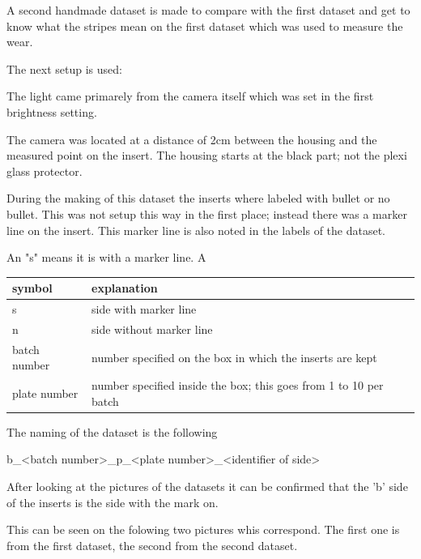 \documentclass{article}
\begin{document}
A second handmade dataset is made to compare with the first dataset and get to know what the stripes mean on the first dataset which was used to measure the wear.



The next setup is used:

The light came primarely from the camera itself which was set in the first brightness setting. 

The camera was located at a distance of 2cm between the housing and the measured point on the insert. The housing starts at the black part; not the plexi glass protector. 

During the making of this dataset the inserts where labeled with bullet or no bullet. This was not setup this way in the first place; instead there was a marker line on the insert. This marker line is also noted in the labels of the dataset.

An "s" means it is with a marker line. A

\begin{tabular}{ |l|l| }
\hline
 symbol & explanation \tabularnewline
\hline
\hline
 s & side with marker line \tabularnewline
\hline
 n & side without marker line \tabularnewline
\hline
 batch number & number specified on the box in which the inserts are kept \tabularnewline
\hline
 plate number & number specified inside the box; this goes from 1 to 10 per batch \tabularnewline
\hline
\end{tabular}


The naming of the dataset is the following

b\_\textless{}batch number\textgreater{}\_p\_\textless{}plate number\textgreater{}\_\textless{}identifier of side\textgreater{}

After looking at the pictures of the datasets it can be confirmed that the 'b' side of the inserts is the side with the mark on. 



This can be seen on the folowing two pictures whis correspond. The first one is from the first dataset, the second from the second dataset.
\end{document}
